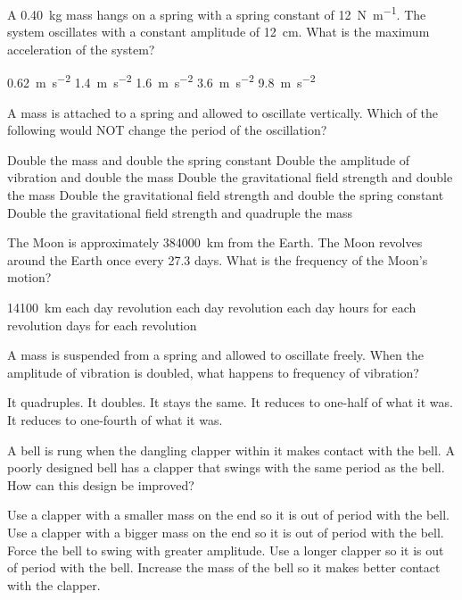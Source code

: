 \documentclass{../../../oss-ap12ibhl-print}
\begin{document}
\genheader
{}

\begin{questions}

  \question A \SI{.40}{\kilo\gram} mass hangs on a spring with a spring
  constant of \SI{12}{\newton\per\metre}. The system oscillates with a constant
  amplitude of \SI{12}{\centi\metre}. What is the maximum acceleration of the
  system?
  \begin{choices}
    \choice\SI{.62}{\metre\per\second\squared}
    \choice\SI{1.4}{\metre\per\second\squared}
    \choice\SI{1.6}{\metre\per\second\squared}
    \choice\SI{3.6}{\metre\per\second\squared}
    \choice\SI{9.8}{\metre\per\second\squared}
  \end{choices}

  \question A mass is attached to a spring and allowed to oscillate vertically.
  Which of the following would NOT change the period of the oscillation?
  \begin{choices}
    \choice Double the mass and double the spring constant
    \choice Double the amplitude of vibration and double the mass
    \choice Double the gravitational field strength and double the mass
    \choice Double the gravitational field strength and double the spring
    constant
    \choice Double the gravitational field strength and quadruple the mass
  \end{choices}
    
  \question The Moon is approximately \SI{384000}{\kilo\metre} from the Earth.
  The Moon revolves around the Earth once every 27.3 days. What is the frequency
  of the Moon's motion?
  \begin{choices}
    \choice \SI{14100}{\kilo\metre} each day
     revolution each day
     revolution each day
     hours for each revolution
     days for each revolution
  \end{choices}

  \question A mass is suspended from a spring and allowed to oscillate freely.
  When the amplitude of vibration is doubled, what happens to frequency of
  vibration?
  \begin{choices}
    \choice It quadruples.
    \choice It doubles.
    \choice It stays the same.
    \choice It reduces to one-half of what it was.
    \choice It reduces to one-fourth of what it was.
  \end{choices}
    
  \question A bell is rung when the dangling clapper within it makes contact
  with the bell. A poorly designed bell has a clapper that swings with the same
  period as the bell. How can this design be improved?
  \begin{choices}
    \choice Use a clapper with a smaller mass on the end so it is out of period
    with the bell.
    \choice Use a clapper with a bigger mass on the end so it is out of period
    with the bell.
    \choice Force the bell to swing with greater amplitude.
    \choice Use a longer clapper so it is out of period with the bell.
    \choice Increase the mass of the bell so it makes better contact with the
    clapper.
  \end{choices}


\end{questions}
\end{document}
